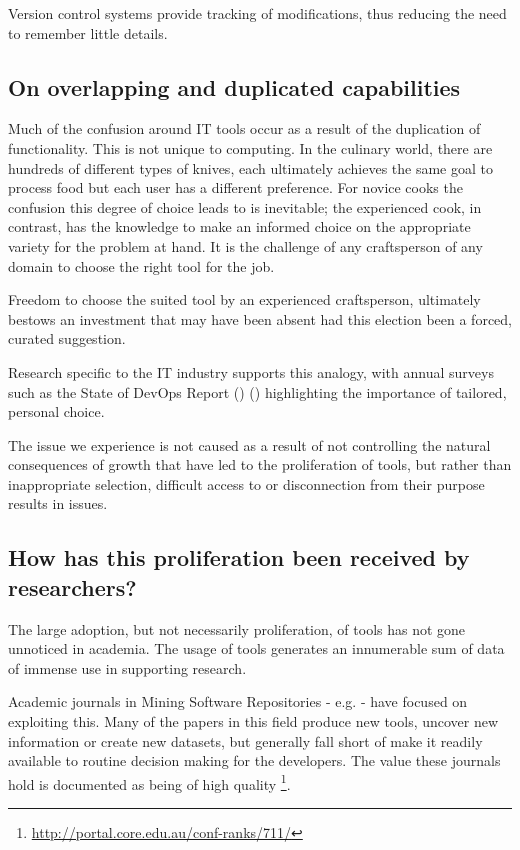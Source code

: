 Version control systems provide tracking of modifications, thus reducing the need to remember little details.

\subsection{On overlapping and duplicated capabilities}

Much of the confusion around IT tools occur as a result of the duplication of functionality. This is not unique to computing. In the culinary world, there are hundreds of different types of knives, each ultimately achieves the same goal to process food but each user has a different preference. For novice cooks the confusion this degree of choice leads to is inevitable; the experienced cook, in contrast, has the knowledge to make an informed choice on the appropriate variety for the problem at hand. It is the challenge of any craftsperson of any domain to choose the right tool for the job.

Freedom to choose the suited tool by an experienced craftsperson, ultimately bestows an investment that may have been absent had this election been a forced, curated suggestion.

Research specific to the IT industry supports this analogy, with annual surveys such as the State of DevOps Report () ()  highlighting the importance of tailored, personal choice. 

The issue we experience is not caused as a result of not controlling the natural consequences of growth that have led to the proliferation of tools, but rather than inappropriate selection, difficult access to or disconnection from their purpose results in issues. 

\subsection{How has this proliferation been received by researchers?}

The large adoption, but not necessarily proliferation, of tools has not gone unnoticed in academia. The usage of tools generates an innumerable sum of data of immense use in supporting research.

Academic journals in Mining Software Repositories - e.g. \cite{Storey:2019:3341883} - have focused on exploiting this. Many of the papers in this field produce new tools, uncover new information or create new datasets, but generally fall short of make it readily available to routine decision making for the developers. The value these journals hold is documented as being of high quality \footnote{\url{http://portal.core.edu.au/conf-ranks/711/}}.

